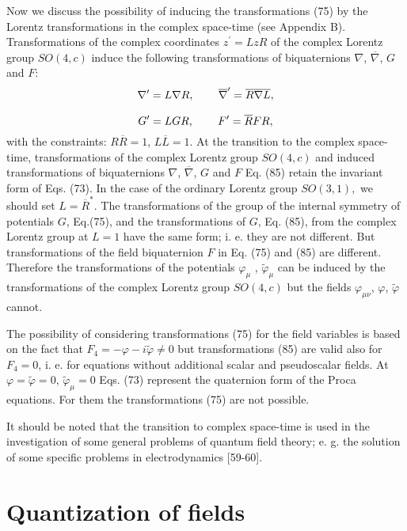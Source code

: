 \documentclass[a4paper,12pt]{article}
\begin{document}
Now we discuss the possibility of inducing the transformations (75) by the
Lorentz transformations in the complex space-time (see Appendix B).
Transformations of the complex coordinates $z^{\prime }=LzR$ of the complex
Lorentz group $SO(4,c)$ induce the following transformations of
biquaternions $\nabla $, $\overline{\nabla }$, $G$ and $F$:
\[
\nabla ^{\prime }=L\nabla R,\hspace{0.3in}\overline{\nabla
}^{\prime }= \overline{R}\overline{\nabla }\overline{L},
\]
\vspace{-8mm}
\begin{equation}  \label{85}
\end{equation}
\vspace{-8mm}
\[
G^{\prime }=LGR,\hspace{0.3in}F^{\prime }=\overline{R}FR,
\]
with the constraints: $R\overline{R}=1$, $L\overline{L}=1$. At the
transition to the complex space-time, transformations of the
complex Lorentz group $SO(4,c)$ and induced transformations of
biquaternions $\nabla $, $ \overline{\nabla }$, $G$ and $F$ Eq.
(85) retain the invariant form of Eqs. (73). In the case of the
ordinary Lorentz group $SO(3,1),$ we should set $L=
\overline{R}^{*}$. The transformations of the group of the
internal symmetry of potentials $G$, Eq.(75), and the
transformations of $G$, Eq. (85), from the complex Lorentz group
at $L=1$ have the same form; i. e. they are not different. But
transformations of the field biquaternion $F$ in Eq. (75) and (85)
are different. Therefore the transformations of the potentials
$\varphi_\mu $ , $\widetilde{\varphi}_\mu$ can be induced by the
transformations of the complex Lorentz group $SO(4,c)$ but the
fields $\varphi _{\mu \nu }$, $\varphi $, $\widetilde{\varphi }$
cannot.

The possibility of considering transformations (75) for the field
variables is based on the fact that
$F_4=-\varphi-i\widetilde{\varphi}\neq 0$ but transformations (85)
are valid also for $F_4=0$, i. e. for equations without additional
scalar and pseudoscalar fields. At $\varphi
=\widetilde{\varphi}=0$, $ \widetilde{\varphi}_\mu =0$ Eqs. (73)
represent the quaternion form of the Proca equations. For them the
transformations (75) are not possible.

It should be noted that the transition to complex space-time is used in the
investigation of some general problems of quantum field theory; e. g. the
solution of some specific problems in electrodynamics [59-60].

\section{Quantization of fields}
\end{document}
